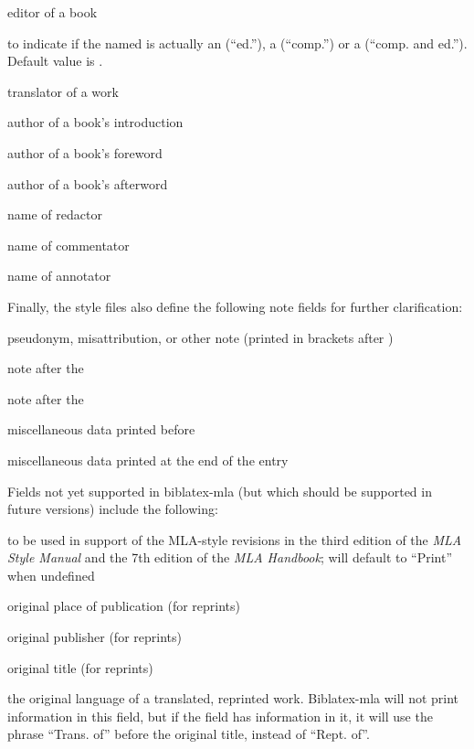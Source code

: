 \documentclass{ltxdockit}[2011/03/25]
\newenvironment*{optionslistNOT}
  {\list{}{%
     \setlength{\labelwidth}{\marglistwidth}%
     \setlength{\labelsep}{\marglistsep}%
     \setlength{\leftmargin}{50pt}%
     \renewcommand*{\makelabel}[1]{\hss\marglistfont##1}}%
   \def\optionitem##1{%
     \item[{\textbf{##1}}]}}
  {\endlist}
\begin{document}
\begin{optionslistNOT}
	\optionitem{editor}
	editor of a book

	\optionitem{editortype}
	to indicate if the named  is actually an  (``ed.''), a  (``comp.'') or a  (``comp. and ed.''). Default value is .

	\optionitem{translator}
	translator of a work

	\optionitem{introduction}
	author of a book's introduction

	\optionitem{foreword}
	author of a book's foreword

	\optionitem{afterword}
	author of a book's afterword

	\optionitem{redactor}
	name of redactor

	\optionitem{commentator}
	name of commentator

	\optionitem{annotator}
	name of annotator

\end{optionslistNOT}

Finally, the style files also define the following note fields for further clarification:

\begin{optionslistNOT}
	\optionitem{nameaddon}
	pseudonym, misattribution, or other note (printed in brackets after )

	\optionitem{booktitleaddon}
	note after the 

	\optionitem{maintitleaddon}
	note after the 

	\optionitem{note}
	miscellaneous data printed before 

	\optionitem{addendum}
	miscellaneous data printed at the end of the entry

\end{optionslistNOT}

Fields not yet supported in biblatex-mla (but which should be supported in future versions) include the following:

\begin{optionslistNOT}
	\optionitem{howpublished}
	to be used in support of the MLA-style revisions in the third edition of the \emph{MLA Style Manual} and the 7th edition of the \emph{MLA Handbook}; will default to ``Print''  when undefined

	\optionitem{origlocation}
	original place of publication (for reprints)

	\optionitem{origpublisher}
	original publisher (for reprints)

	\optionitem{origtitle}
	original title (for reprints)

	\optionitem{origlanguage}
	the original language of a translated, reprinted work. Biblatex-mla will not print information in this field, but if the field has information in it, it will use the phrase ``Trans. of''  before the original title, instead of ``Rept. of''.

\end{optionslistNOT}
\end{document}
